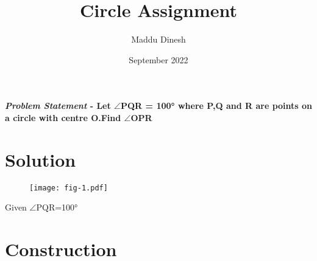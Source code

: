 \documentclass[journal,10pt,twocolumn]{article}
\title{\textbf{Circle Assignment}}
\author{Maddu Dinesh}
\date{September 2022}
\begin{document}
\maketitle
\paragraph{\textit{Problem Statement} - Let $\angle$PQR = 100° where P,Q and R are points on a circle with centre O.Find $\angle$OPR}

\section*{\large Solution}

\begin{figure}[H]
\centering
\texttt{[image: fig-1.pdf]}
\label{fig:triangle}
\end{figure}



Given  $\angle$PQR=100°





\section*{ Construction}
\end{document}

